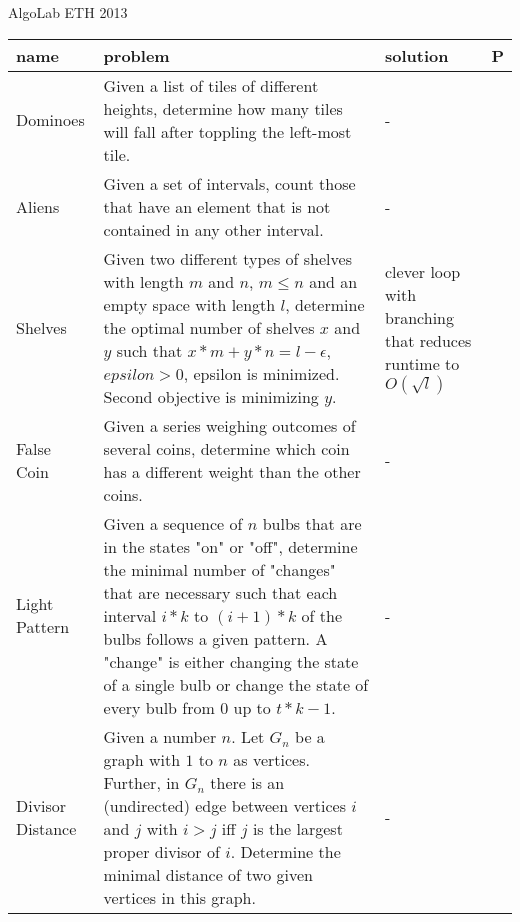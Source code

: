 \documentclass[a4paper, 10pt]{article}
\begin{document}
    \vspace*{1cm}
    \begin{center}
        {\huge AlgoLab ETH 2013}
    \end{center}
    \vspace{1cm}
    \begin{longtable}{ L{2cm} L{8cm} L{4cm} r}
        name & problem & solution & P\\
      \hline
        Dominoes 
        & Given a list of tiles of different heights, determine how many tiles will
            fall after toppling the left-most tile.
        & - &  \pageref{sec:dominoes} \\

        Aliens
        & Given a set of intervals, count those that have an element that is not contained in any other interval. 
        & - &  \pageref{sec:aliens} \\

        Shelves 
        & Given two different types of shelves with length $m$ and $n$, $m\leq n$ and an empty space with length $l$,
            determine the optimal number of shelves $x$ and $y$ such that $x*m + y*n = l-\epsilon$, $epsilon>0$,
            epsilon is minimized. Second objective is minimizing $y$.
        & clever loop with branching that reduces runtime to $O(\sqrt{l})$ &  \pageref{sec:shelves} \\

        False Coin 
        & Given a series weighing outcomes of several coins, determine which coin has a different weight than the other coins. 
        & - &  \pageref{sec:false_coin} \\

        Light Pattern 
        & Given a sequence of $n$ bulbs that are in the states "on" or "off", determine the minimal number of "changes" that are necessary such that  
            each interval $i*k$ to $(i+1)*k$ of the bulbs follows a given pattern. A "change" is either changing the state of a single bulb or
            change the state of every  bulb from $0$ up to $t*k-1$.
        & - &  \pageref{sec:light_pattern} \\

        Divisor Distance 
        & Given a number $n$. Let $G_n$ be a graph with $1$ to $n$ as vertices. Further, in $G_n$ there is an (undirected) 
            edge between vertices $i$ and $j$ with $i>j$ iff $j$ is the largest proper divisor of $i$. 
            Determine the minimal distance of two given vertices in this graph.
        & - &  \pageref{sec:divisor_distance} \\


\end{longtable}
\end{document}
